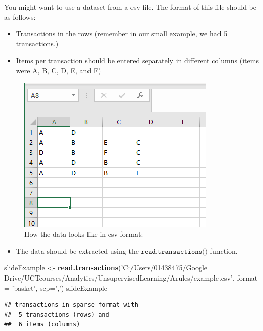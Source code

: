 \documentclass[
]{book}
\newenvironment{Shaded}{\begin{snugshade}}{\end{snugshade}}
\newcommand{\DataTypeTok}[1]{\textcolor[rgb]{0.13,0.29,0.53}{#1}}
\newcommand{\KeywordTok}[1]{\textcolor[rgb]{0.13,0.29,0.53}{\textbf{#1}}}
\newcommand{\NormalTok}[1]{#1}
\newcommand{\StringTok}[1]{\textcolor[rgb]{0.31,0.60,0.02}{#1}}
\providecommand{\tightlist}{%
  \setlength{\itemsep}{0pt}\setlength{\parskip}{0pt}}
\begin{document}
You might want to use a dataset from a csv file. The format of this file should be as follows:

\begin{itemize}
\tightlist
\item
  Transactions in the rows (remember in our small example, we had 5 transactions.)
\item
  Items per transaction should be entered separately in different columns (items were A, B, C, D, E, and F)
\end{itemize}

\begin{figure}
\centering
\includegraphics{example.png}
\caption{How the data looks like in csv format:}
\end{figure}

\begin{itemize}
\tightlist
\item
  The data should be extracted using the \(\texttt{read.transactions()}\) function.
\end{itemize}

\begin{Shaded}
\begin{Highlighting}[]
\NormalTok{slideExample <-}\StringTok{ }\KeywordTok{read.transactions}\NormalTok{(}\StringTok{'C:/Users/01438475/Google Drive/UCTcourses/Analytics/UnsupervisedLearning/Arules/example.csv'}\NormalTok{, }\DataTypeTok{format =} \StringTok{'basket'}\NormalTok{, }\DataTypeTok{sep=}\StringTok{','}\NormalTok{)}
\NormalTok{slideExample}
\end{Highlighting}
\end{Shaded}

\begin{verbatim}
## transactions in sparse format with
##  5 transactions (rows) and
##  6 items (columns)
\end{verbatim}
\end{document}
